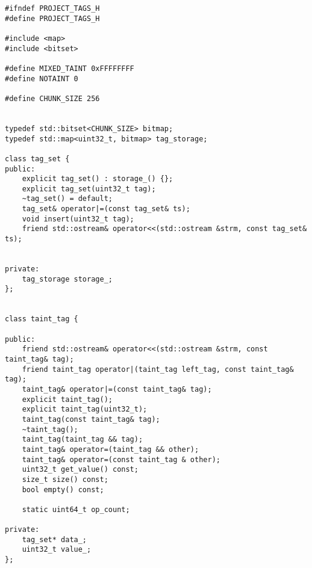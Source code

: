 \begin{lstlisting}[environoment=сpp_code, caption=tags.h]
#ifndef PROJECT_TAGS_H
#define PROJECT_TAGS_H

#include <map>
#include <bitset>

#define MIXED_TAINT 0xFFFFFFFF
#define NOTAINT 0

#define CHUNK_SIZE 256


typedef std::bitset<CHUNK_SIZE> bitmap;
typedef std::map<uint32_t, bitmap> tag_storage;

class tag_set {
public:
    explicit tag_set() : storage_() {};
    explicit tag_set(uint32_t tag);
    ~tag_set() = default;
    tag_set& operator|=(const tag_set& ts);
    void insert(uint32_t tag);
    friend std::ostream& operator<<(std::ostream &strm, const tag_set& ts);

    
private:
    tag_storage storage_;
};


class taint_tag {

public:
    friend std::ostream& operator<<(std::ostream &strm, const taint_tag& tag);
    friend taint_tag operator|(taint_tag left_tag, const taint_tag& tag);
    taint_tag& operator|=(const taint_tag& tag);
    explicit taint_tag();
    explicit taint_tag(uint32_t);
    taint_tag(const taint_tag& tag);
    ~taint_tag();
    taint_tag(taint_tag && tag);
    taint_tag& operator=(taint_tag && other);
    taint_tag& operator=(const taint_tag & other);
    uint32_t get_value() const;
    size_t size() const;
    bool empty() const;

    static uint64_t op_count;

private:
    tag_set* data_;
    uint32_t value_;
};
\end{lstlisting}

